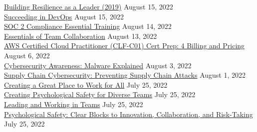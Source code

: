 \documentclass[10pt]{res} %
\begin{document}
\begin{resume}
\href{https://www.linkedin.com/learning/certificates/6d30f5423ce512454baa063a314189681f647a1b2644d8756dbc703c369298a0}{\color{blue}Building Resilience as a Leader (2019)} \hfill August 15, 2022 \\
\href{https://www.linkedin.com/learning/certificates/a16a2f67b6132fbac182edc5ead05222201c9bc79f96ae37ab8b67146518b17d}{\color{blue}Succeeding in DevOps} \hfill August 15, 2022 \\
\href{https://www.linkedin.com/learning/certificates/6c72537d8af6ffd057bac0082ca54d08bb8ac9d00d3c84ec6b61e6b5aaa9780d}{\color{blue}SOC 2 Compliance Essential Training} \hfill August 14, 2022 \\
\href{https://www.linkedin.com/learning/certificates/b3d53b90a06b800b67698f174b3207d02bec93432ccc0967d2144d101a5e1548}{\color{blue}Essentials of Team Collaboration} \hfill August 13, 2022 \\
\href{https://www.linkedin.com/learning/certificates/75ec407ea906978b848304fd2b3a7f80cd6bbb3badca071fd200e46f4e3084d3}{\color{blue}AWS Certified Cloud Practitioner (CLF-C01) Cert Prep: 4 Billing and Pricing} \hfill August 6, 2022 \\
\href{https://www.linkedin.com/learning/certificates/1db94358deef9a8e4a85e42553333f17df8c7b64eb810d3e7a53852083d85516}{\color{blue}Cybersecurity Awareness: Malware Explained} \hfill August 3, 2022 \\
\href{https://www.linkedin.com/learning/certificates/5ae56903e57fbe01637f0b7b8ec7caf185f65926d4c32301b5141ac8ac2d6ac8}{\color{blue}Supply Chain Cybersecurity: Preventing Supply Chain Attacks} \hfill August 1, 2022 \\
\href{https://www.linkedin.com/learning/certificates/db9ad1b0e8e80a4c0ae4aa4989b16fcfe915a20ac3d934b234b593943d5fa811}{\color{blue}Creating a Great Place to Work for All} \hfill July 25, 2022 \\
\href{https://www.linkedin.com/learning/certificates/27e938cecac9da5347446adf9c0302d5749202c60afd7491878c55d2a7c2607a}{\color{blue}Creating Psychological Safety for Diverse Teams} \hfill July 25, 2022 \\
\href{https://www.linkedin.com/learning/certificates/61a128bee61b4c5be52e53cd482aafbdb10a96fb2b397927dfe29a6a6708767f}{\color{blue}Leading and Working in Teams} \hfill July 25, 2022 \\
\href{https://www.linkedin.com/learning/certificates/21110dadc3a24a4115df780aa783d4c137d38e065dc5fc33e5528e9bb2e5d69e}{\color{blue}Psychological Safety: Clear Blocks to Innovation, Collaboration, and Risk-Taking} \hfill July 25, 2022 \\

\end{resume}
\end{document}
